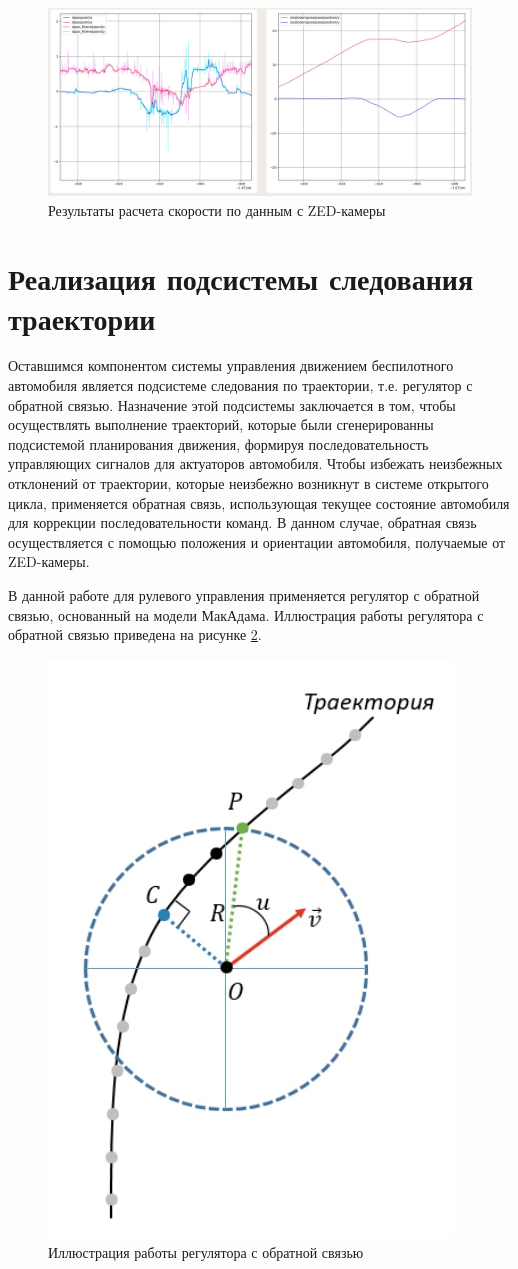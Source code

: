 \begin{figure}[h]
    \centering
    \includegraphics[width=\linewidth]{images/3_devel/zed_calc_speed}
    \caption{Результаты расчета скорости по данным с ZED-камеры}
    \label{img:zed_calc_speed}
\end{figure}

\section{Реализация подсистемы следования траектории}

Оставшимся компонентом системы управления движением беспилотного автомобиля является подсистеме следования по траектории,
т.е. регулятор с обратной связью. Назначение этой подсистемы заключается в том, чтобы осуществлять выполнение траекторий,
которые были сгенерированны подсистемой планирования движения, формируя последовательность управляющих сигналов для
актуаторов автомобиля. Чтобы избежать неизбежных отклонений от траектории, которые неизбежно возникнут в системе
открытого цикла, применяется обратная связь, использующая текущее состояние автомобиля для коррекции последовательности
команд. В данном случае, обратная связь осуществляется с помощью положения и ориентации автомобиля, получаемые от
ZED-камеры.

В данной работе для рулевого управления применяется регулятор с обратной связью, основанный на модели МакАдама.
Иллюстрация работы регулятора с обратной связью приведена на рисунке \ref{img:path_moving}.

\begin{figure}[h]
    \centering
    \includegraphics[width=0.4\linewidth]{images/path_moving}
    \caption{Иллюстрация работы регулятора с обратной связью}
    \label{img:path_moving}
\end{figure}

